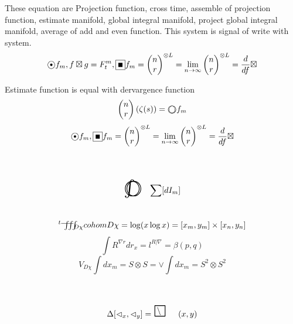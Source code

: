 \documentclass{jsarticle}
\begin{document}
 \newcommand{\average}{%
	  \begin{picture}(30,45)
		  \put(0,0){\scalebox{2.0}[2]{$\square$}}
		  \put(4,4){$\setminus$}
	  \end{picture}%
  } 
 
 These equation are Projection function, cross time, assemble of projection
 function, estimate manifold, global integral manifold, project global 
 integral manifold, average of add and even function.
 This system is signal of write with system.
  $$ \whitewithblack f_m , f \boxtimes g = F^{m}_t, 
  \whitewithblacksquare f_m = {\begin{pmatrix}
	  n \\
  r \end{pmatrix}}^{\otimes L} = \lim_{n \to \infty}
  {\begin{pmatrix}
	  n \\
  r \end{pmatrix}}^{\otimes L} = {d \over {d f}}\boxtimes $$

  \newcommand{\whitewithwhitecircle}
  {\text{\textcircled{\phantom{\textbullet}}}}
  Estimate function is equal with dervargence function
  $$ \begin{pmatrix}
	  n \\
  r \end{pmatrix}(\zeta(s)) = \whitewithbodercircle f_m $$
  $$ \whitewithblack f_m ,
  \whitewithblacksquare f_m = {\begin{pmatrix}
	  n \\
  r \end{pmatrix}}^{\otimes L} = \lim_{n \to \infty}
  {\begin{pmatrix}
	  n \\
  r \end{pmatrix}}^{\otimes L} = {d \over {d f}}\boxtimes $$


 

$$ \whitewithbodercircleint \sum [dI_m] $$
$$ {}^t\variiint_{D\chi} cohom D\chi = \log(x\log x) = [x_m,y_m]\times
[x_n,y_n] $$
$$ \int R^{\nabla r}dr_x = l^{R|\nabla} = \beta(p,q) $$
$$ V_{D\chi}\int dx_m = S \otimes S = \vee\int dx_m = S^2 \otimes S^2 $$
$$ \Delta[\vartriangleleft_x,\vartriangleleft_y] = \average(x,y) $$

  \newcommand{\whitewithboder}{%
	  \begin{picture}(15,30)
		  \put(0,0){\scalebox{2.0}[2]{$\square$}}
		  \put(4,4){$\square$}
	  \end{picture}%
  } 
  \newcommand{\whitewithnabla}{%
	  \begin{picture}(15,30)
		  \put(0,0){\scalebox{2.0}[2]{$\nabla$}}
		  \put(3,3){$\nabla$}
	  \end{picture}%
  } 
\end{document}
